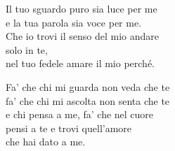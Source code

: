 	\begin{mystrofe}
		Il tuo sguardo puro sia luce per me \\
		e la tua parola sia voce per me. \\
		Che io trovi il senso del mio andare \\
		solo in te, \\
		nel tuo fedele amare il mio perché. \\
	\end{mystrofe}

	\begin{mystrofe}
		\ritornello{}
	\end{mystrofe}

	\begin{mystrofe}
		Fa' che chi mi guarda non veda che te \\
		fa' che chi mi ascolta non senta che te \\
		e chi pensa a me, fa' che nel cuore \\
		pensi a te e trovi quell'amore \\
		che hai dato a me. \\
	\end{mystrofe}

	\begin{mystrofe}
		\ritornello{}
	\end{mystrofe}
